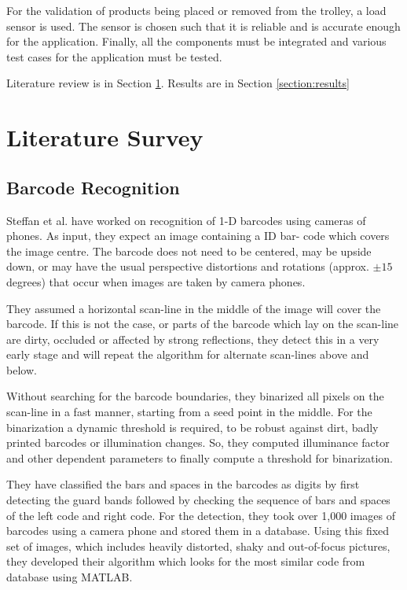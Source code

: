 \documentclass[times, 1pt, a4paper]{article}
\begin{document}
For the validation of products being placed or removed from the trolley, a load sensor is used. The sensor is chosen such that it is reliable and is accurate enough for the application. Finally, all the components must be integrated and various test cases for the application must be tested.


Literature review is in Section \ref{section:literature_survey}. Results are in Section \ref{section:results}

\section{Literature Survey} \label{section:literature_survey}

\subsection{Barcode Recognition} \label{subsection:barcode_recognition}

Steffan et al. \cite{zhang2012research} have worked on recognition of 1-D barcodes using cameras of phones. As input, they expect an image containing a ID bar- code which covers the image centre. The barcode does not need to be centered, may be upside down, or may have the usual perspective distortions and rotations (approx. $\pm 15$  degrees) that occur when images are taken by camera phones. 

They assumed a horizontal scan-line in the middle of the image will cover the barcode. If this is not the case, or parts of the barcode which lay on the scan-line are dirty, occluded or affected by strong reflections, they detect this in a very early stage and will repeat the algorithm for alternate scan-lines above and below. 

Without searching for the barcode boundaries, they binarized all pixels on the scan-line in a fast manner, starting from a seed point in the middle. For the binarization a dynamic threshold is required, to be robust against dirt, badly printed barcodes or illumination changes. So, they computed illuminance factor and other dependent parameters to finally compute a threshold for binarization.

They have classified the bars and spaces in the barcodes as digits by first detecting the guard bands followed by checking the sequence of bars and spaces of the left code and right code. For the detection, they took over 1,000 images of barcodes using a camera phone and stored them in a database. Using this fixed set of images, which includes heavily distorted, shaky and out-of-focus pictures, they developed their algorithm which looks for the most similar code from database using MATLAB. 
\end{document}
